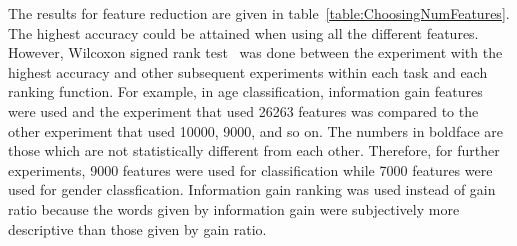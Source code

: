 \documentclass[a4paper]{llncs}
\begin{document}
The results for feature reduction are given in table~\ref{table:ChoosingNumFeatures}. The highest accuracy could be attained when using all the different features. However, Wilcoxon signed rank test~\cite{wilcoxon1945individual} was done between the experiment with the highest accuracy and other subsequent experiments within each task and each ranking function. For example, in age classification, information gain features were used and the experiment that used 26263 features was compared to the other experiment that used 10000, 9000, and so on. The numbers in boldface are those which are not statistically different from each other. Therefore, for further experiments, 9000 features were used for classification while 7000 features were used for gender classfication. Information gain ranking was used instead of gain ratio because the words given by information gain were subjectively more descriptive than those given by gain ratio. 
\end{document}

